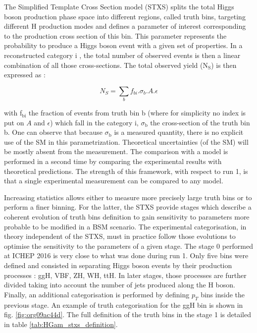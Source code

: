 \begin{enumerate}
The Simplified Template Cross Section \cite{arXiv_1605.04692} model (STXS) splits the total Higgs boson production phase space into different regions, called truth bins, targeting different H production modes and defines a parameter of interest corresponding to the production cross section of this bin.
This parameter represents the probability to produce a Higgs boson event with a given set of properties.
In a reconstructed category i , the total number of observed events is then a linear combination of all those cross-sections.
The total observed yield (N\(_{\text{S}}\)) is then expressed as :

\begin{equation}
N_S = \sum\limits_{b} f_{bi} .\sigma_{b} . A . \epsilon
\end{equation}

with f\(_{\text{bi}}\) the fraction of events from truth bin b (where for simplicity no index is put on $A$ and $\epsilon$) which fall in the category i, \(\sigma_{\text{b}}\) the cross-section of the truth bin b.
One can observe that because \(\sigma_{\text{b}}\) is a measured quantity, there is no explicit use of the SM in this parametrization.
Theoretical uncertainties (of the SM) will be mostly absent from the measurement.
The comparison with a model is performed in a second time by comparing the experimental results with theoretical predictions.
The strength of this framework, with respect to run 1, is that a single experimental measurement can be compared to any model.

Increasing statistics allows either to measure more precisely large truth bins or to perform a finer binning.
For the latter, the STXS provide stages which describe a coherent evolution of truth bins definition to gain sensitivity to parameters more probable to be modified in a BSM scenario.
The experimental categorisation, in theory independent of the STXS, must in practice follow those evolutions to optimise the sensitivity to the parameters of a given stage.
The stage 0 performed at ICHEP 2016 \cite{ATLAS-CONF-2016-081} is very close to what was done during run 1.
Only five bins were defined and consisted in separating Higgs boson events by their production processes : ggH, VBF, ZH, WH, ttH.
In later stages, those processes are further divided taking into account the number of jets produced along the H boson.
Finally, an additional categorisation is performed by defining $p_T$ bins inside the previous stage.
An example of truth categorisation for the ggH bin is shown in fig. \ref{fig:org09ac44d}.
The full definition of the truth bins in the stage 1 is detailed in table \ref{tab:HGam_stxs_definition}.


\end{enumerate}
